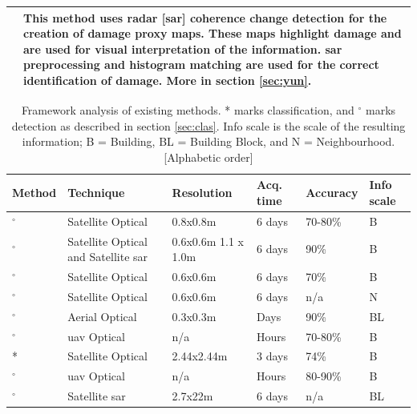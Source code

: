 \begin{table} [!h]
\begin{footnotesize}
\begin{tabular}{p{3cm}p{8cm}}
			\citep{Yun2015} & This method uses radar [\ac{sar}] coherence change detection for the creation of damage proxy maps. These maps highlight damage and are used for visual interpretation of the information. \ac{sar} preprocessing and histogram matching are used for the correct identification of damage. More in section \ref{sec:yun}.\\
			\bottomrule
		\end{tabular}
	\end{footnotesize}
	\label{tab:emethod1}
\end{table}

\begin{table} [!h]
	\centering
	\caption{\footnotesize{Framework analysis of existing methods. * marks classification, and $^{\circ}$ marks detection as described in section \ref{sec:clas}. Info scale is the scale of the resulting information; B = Building, BL = Building Block, and N = Neighbourhood. [Alphabetic order] }}
	\begin{footnotesize}
		\begin{tabular}{p{3cm}p{2.6cm}p{1.4cm}p{0.9cm}p{0.9cm}p{0.5cm}}
			\toprule
			Method & Technique & Resolution & Acq. time & Accuracy & Info scale\\
			\midrule
			\citep{Antonietta2015}$^{\circ}$ & Satellite Optical & 0.8x0.8m & 6 days & 70-80\% & B\\
			\citep{Brunner2010}$^{\circ}$ & Satellite Optical and Satellite \ac{sar} & 0.6x0.6m 1.1 x 1.0m & 6 days & 90\% & B\\
			\citep{Li2017}$^{\circ}$ & Satellite Optical & 0.6x0.6m & 6 days & 70\% & B\\
			\citep{Martha2015}$^{\circ}$ & Satellite Optical & 0.6x0.6m & 6 days & n/a & N\\
			\citep{Menderes2015}$^{\circ}$ & Aerial Optical & 0.3x0.3m  & Days &90\% & BL\\
			\citep{Ozisik2004}$^{\circ}$ & \ac{uav} Optical & n/a  & Hours & 70-80\% & B\\
			\citep{Samadzadegan2005}* & Satellite Optical & 2.44x2.44m  & 3 days & 74\% & B\\
			\citep{Vetrivel2016b}$^{\circ}$ & \ac{uav} Optical & n/a  & Hours & 80-90\% & B\\
			\citep{Yun2015}$^{\circ}$ & Satellite \ac{sar} & 2.7x22m  & 6 days & n/a & BL\\
			\bottomrule
		\end{tabular}
	\end{footnotesize}
	\label{tab:emethod2}
\end{table}


